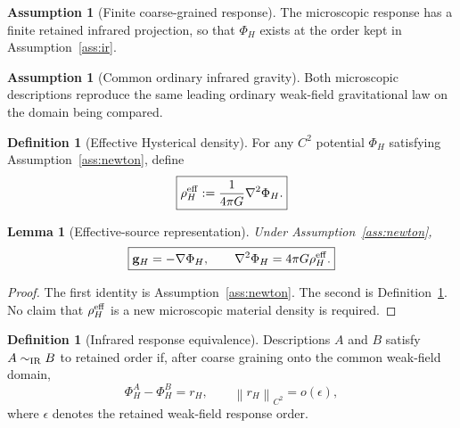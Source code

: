 \documentclass[11pt]{article}
\newtheorem{lemma}[theorem]{Lemma}
\theoremstyle{definition}
\newtheorem{definition}[theorem]{Definition}
\newtheorem{assumption}[theorem]{Assumption}
\theoremstyle{remark}
\newcommand{\norm}[1]{\left\lVert #1\right\rVert}
\begin{document}
\begin{assumption}[Finite coarse-grained response]\label{ass:finite}
The microscopic response has a finite retained infrared projection, so that $\Phi_H$ exists at the order kept in Assumption~\ref{ass:ir}.
\end{assumption}

\begin{assumption}[Common ordinary infrared gravity]\label{ass:ordinary}
Both microscopic descriptions reproduce the same leading ordinary weak-field gravitational law on the domain being compared.
\end{assumption}

\begin{definition}[Effective Hysterical density]\label{def:rho}
For any $C^2$ potential $\Phi_H$ satisfying Assumption~\ref{ass:newton}, define
\begin{equation}
 \boxed{\rho_H^{\rm eff}:=\frac{1}{4\pi G}\nabla^2\Phi_H.}
 \label{eq:rhoeff}
\end{equation}
\end{definition}

\begin{lemma}[Effective-source representation]\label{lem:representation}
Under Assumption~\ref{ass:newton},
\begin{equation}
 \boxed{\mathbf g_H=-\nabla\Phi_H,\qquad
 \nabla^2\Phi_H=4\pi G\rho_H^{\rm eff}.}
 \label{eq:poissonH}
\end{equation}
\end{lemma}
\begin{proof}
The first identity is Assumption~\ref{ass:newton}. The second is Definition~\ref{def:rho}. No claim that $\rho_H^{\rm eff}$ is a new microscopic material density is required.
\end{proof}

\begin{definition}[Infrared response equivalence]
Descriptions $A$ and $B$ satisfy $A\sim_{\rm IR}B$ to retained order if, after coarse graining onto the common weak-field domain,
\begin{equation}
 \Phi_H^A-\Phi_H^B=r_H,
 \qquad
 \norm{r_H}_{C^2}=o(\epsilon),
 \label{eq:ireq}
\end{equation}
where $\epsilon$ denotes the retained weak-field response order.
\end{definition}
\end{document}
